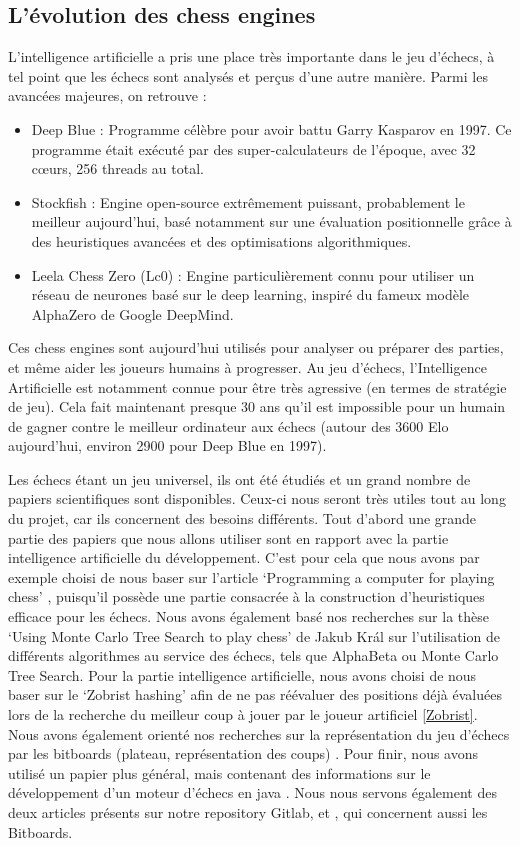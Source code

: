 \documentclass{article}
\begin{document}
\subsection{L’évolution des chess engines}
L’intelligence artificielle a pris une place très importante dans le jeu d'échecs, à tel point que les échecs
sont analysés et perçus d'une autre manière. Parmi les avancées majeures, on retrouve :
\begin{itemize}
    \item Deep Blue : Programme célèbre pour avoir battu Garry Kasparov en 1997. Ce programme était exécuté par des super-calculateurs
    de l'époque, avec 32 cœurs, 256 threads au total.
    \item Stockfish : Engine open-source extrêmement puissant, probablement le meilleur aujourd'hui, basé notamment sur une évaluation positionnelle
    grâce à des heuristiques avancées et des optimisations algorithmiques.
    \item Leela Chess Zero (Lc0) : Engine particulièrement connu pour utiliser un réseau de neurones basé sur le deep learning, inspiré du fameux
    modèle AlphaZero de Google DeepMind.
\end{itemize}
Ces chess engines sont aujourd’hui utilisés pour analyser ou préparer des parties, et même aider les
joueurs humains à progresser. Au jeu d'échecs, l'Intelligence Artificielle est notamment connue pour être très agressive
(en termes de stratégie de jeu). Cela fait maintenant presque 30 ans qu'il est impossible pour un humain de gagner contre
le meilleur ordinateur aux échecs (autour des 3600 Elo aujourd'hui, environ 2900 pour Deep Blue en 1997).

Les échecs étant un jeu universel, ils ont été étudiés et un grand nombre de papiers scientifiques
sont disponibles. Ceux-ci nous seront très utiles tout au long du projet, car ils concernent des
besoins différents. Tout d'abord une grande partie des papiers que nous allons utiliser sont en rapport
avec la partie intelligence artificielle du développement. C'est pour cela que nous avons par exemple
choisi de nous baser sur l'article `Programming a computer for playing chess' \cite{Shannon1950}, 
puisqu'il possède une partie consacrée à la construction d'heuristiques efficace pour les échecs.
Nous avons également basé nos recherches sur la thèse `Using Monte Carlo Tree Search to play chess' \cite{Kral2021}
de Jakub Král sur l'utilisation de différents algorithmes au service des échecs, tels que AlphaBeta ou
Monte Carlo Tree Search. Pour la partie intelligence artificielle, nous avons choisi de nous baser sur le 
`Zobrist hashing' \cite{ZobristHashing} afin de ne pas réévaluer des positions déjà évaluées lors de la 
recherche du meilleur coup à jouer par le joueur artificiel \ref{Zobrist}. Nous avons également orienté
nos recherches sur la représentation du jeu d'échecs par les bitboards (plateau, représentation des coups) \cite{Bijl2021}.
Pour finir, nous avons utilisé un papier plus général, mais contenant des informations sur le développement
d'un moteur d'échecs en java \cite{PaulDailly}. Nous nous servons également des deux articles présents sur 
notre repository Gitlab, \cite{Bitboards} et \cite{GameBitboards}, qui concernent aussi les Bitboards.
\end{document}
